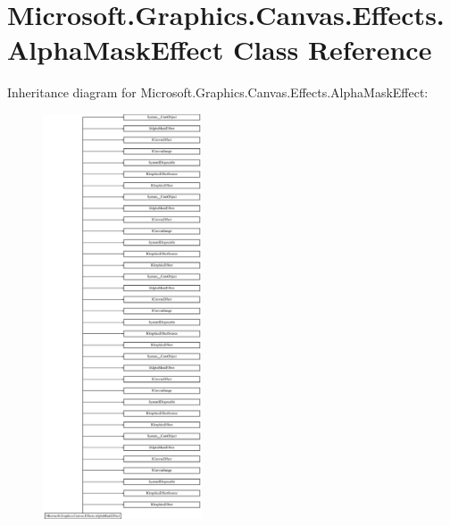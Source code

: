 \hypertarget{class_microsoft_1_1_graphics_1_1_canvas_1_1_effects_1_1_alpha_mask_effect}{}\section{Microsoft.\+Graphics.\+Canvas.\+Effects.\+Alpha\+Mask\+Effect Class Reference}
\label{class_microsoft_1_1_graphics_1_1_canvas_1_1_effects_1_1_alpha_mask_effect}
Inheritance diagram for Microsoft.\+Graphics.\+Canvas.\+Effects.\+Alpha\+Mask\+Effect\+:\begin{figure}[H]
\begin{center}
\leavevmode
\includegraphics[height=12.000000cm]{class_microsoft_1_1_graphics_1_1_canvas_1_1_effects_1_1_alpha_mask_effect}
\end{center}
\end{figure}
